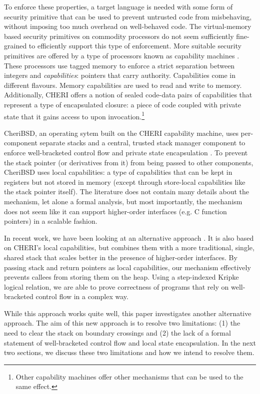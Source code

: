 \documentclass[sigplan, review]{acmart}
\begin{document}
To enforce these properties, a target language is needed with some form of security primitive that can be used to prevent untrusted code from misbehaving, without imposing too much overhead on well-behaved code.
The virtual-memory based security primitives on commodity processors do not seem sufficiently fine-grained to efficiently support this type of enforcement.
More suitable security primitives are offered by a type of processors known as capability machines \citep{levy_capability-based_1984,watson_cheri:_2015}.
These processors use tagged memory to enforce a strict separation between integers and \emph{capabilities}: pointers that carry authority.
Capabilities come in different flavours.
Memory capabilities are used to read and write to memory.
Additionally, CHERI offers a notion of sealed code-data pairs of capabilities that represent a type of encapsulated closure: a piece of code coupled with private state that it gains access to upon invocation.\footnote{Other capability machines offer other mechanisms that can be used to the same effect.} 

CheriBSD, an operating sytem built on the CHERI capability machine, uses per-component separate stacks and a central, trusted stack manager component to enforce well-bracketed control flow and private state encapsulation \citep{watson_cheri:_2015}.
To prevent the stack pointer (or derivatives from it) from being passed to other components, CheriBSD uses local capabilities: a type of capabilities that can be kept in registers but not stored in memory (except through store-local capabilities like the stack pointer itself).
The literature does not contain many details about the mechanism, let alone a formal analysis, but most importantly, the mechanism does not seem like it can support higher-order interfaces (e.g. C function pointers) in a scalable fashion.

In recent work, we have been looking at an alternative approach \citep{skorstengaard_reasoning_2017}.
It is also based on CHERI's local capabilities, but combines them with a more traditional, single, shared stack that scales better in the presence of higher-order interfaces.
By passing stack and return pointers as local capabilities, our mechanism effectively prevents callees from storing them on the heap.
Using a step-indexed Kripke logical relation, we are able to prove correctness of programs that rely on well-bracketed control flow in a complex way.

While this approach works quite well, this paper investigates another alternative approach.
The aim of this new approach is to resolve two limitations: (1) the need to clear the stack on boundary crossings and (2) the lack of a formal statement of well-bracketed control flow and local state encapsulation.
In the next two sections, we discuss these two limitations and how we intend to resolve them.
\end{document}
